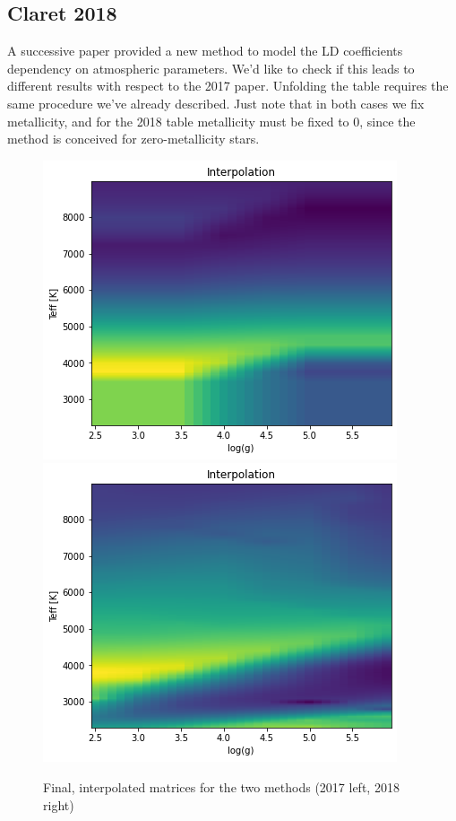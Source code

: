 \documentclass[a4paper,11pt,twocolumn]{article}
\begin{document}
\subsection{Claret 2018}
A successive paper provided a new method to model the LD coefficients dependency 
on atmospheric parameters. We'd like to check if this leads to different results 
with respect to the 2017 paper. Unfolding the table requires the same procedure 
we've already described. Just note that in both cases we fix metallicity, and for 
the 2018 table metallicity must be fixed to 0, since the method is conceived for
zero-metallicity stars.
\begin{figure}[H]
    \centering  
    \includegraphics[scale=0.5, angle=0]{../pictures/ClaretvClaret/2017.png}
    \includegraphics[scale=0.5, angle=0]{../pictures/ClaretvClaret/2018.png}
    \caption{Final, interpolated matrices for the two methods (2017 left, 2018 right)}
\end{figure}
\end{document}
